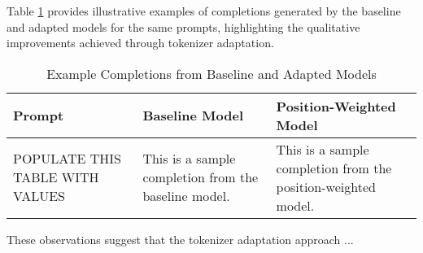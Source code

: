 Table \ref{tab:example_completions} provides illustrative examples of completions generated by the baseline and adapted models for the same prompts, highlighting the qualitative improvements achieved through tokenizer adaptation.

\begin{table}[h]
\centering
\caption{Example Completions from Baseline and Adapted Models}
\label{tab:example_completions}
\begin{tabular}{p{4cm}p{5cm}p{5cm}}
\hline
\textbf{Prompt} & \textbf{Baseline Model} & \textbf{Position-Weighted Model} \\
\hline
POPULATE THIS TABLE WITH VALUES & This is a sample completion from the baseline model. & This is a sample completion from the position-weighted model. \\
\hline
\end{tabular}
\end{table}

These observations suggest that the tokenizer adaptation approach ...